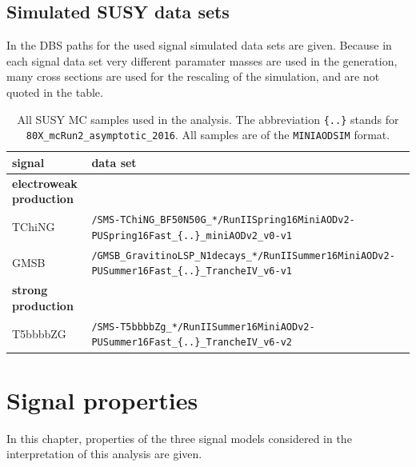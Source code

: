 \FloatBarrier
\section*{Simulated SUSY data sets}
In  the DBS paths for the used signal simulated data sets are given. Because in each signal data set very different paramater masses are used in the generation, many cross sections are used for the rescaling of the simulation, and are not quoted in the table.

\begin{table}[tb]
 \centering
 \caption{All SUSY MC samples used in the analysis. The abbreviation \texttt{\{..\}} stands for \texttt{80X\_mcRun2\_asymptotic\_2016}. All samples are of the \texttt{MINIAODSIM} format.}
 \scriptsize
 \label{tab:app_signalsets}
 \begin{tabular}[width=\textwidth]{ll}
  \hline
  \normalsize{signal}             & \normalsize{data set}   \\\hline
  \textbf{electroweak production} &                         \\
  TChiNG                          & \verb|/SMS-TChiNG_BF50N50G_*/RunIISpring16MiniAODv2-PUSpring16Fast_{..}_miniAODv2_v0-v1| \\
  GMSB                            & \verb|/GMSB_GravitinoLSP_N1decays_*/RunIISummer16MiniAODv2-PUSummer16Fast_{..}_TrancheIV_v6-v1| \\
  \textbf{strong production}      &                         \\
  T5bbbbZG                        & \verb|/SMS-T5bbbbZg_*/RunIISummer16MiniAODv2-PUSummer16Fast_{..}_TrancheIV_v6-v2| \\
  \hline
 \end{tabular}
\end{table}

\FloatBarrier

\chapter{Signal properties}\label{sec:app_signal}
In this chapter, properties of the three signal models considered in the interpretation of this analysis are given.
